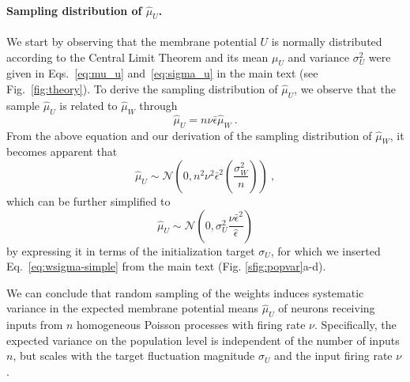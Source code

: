 \documentclass[11pt,a4paper]{article}
\begin{document}
\begin{refsection}
\paragraph{Sampling distribution of $\hat \mu_U$.}
We start by observing that the membrane potential $U$ is normally distributed according to the Central Limit Theorem and its mean $\mu_U$ and variance $\sigma_U^2$ were given in Eqs.~\eqref{eq:mu_u} and~\eqref{eq:sigma_u} in the main text (see Fig.~\ref{fig:theory}). 
To derive the sampling distribution of $\hat \mu_U$, we observe that the sample $\hat \mu_U$ is related to $\hat \mu_W$ through
\begin{equation}
    \hat \mu_U = n \nu \bar \epsilon \hat \mu_W  ~.
\end{equation}
From the above equation and our derivation of the sampling distribution of $\hat \mu_W$, it becomes apparent that
\begin{equation}
    \hat \mu_U \sim \mathcal{N} \left(0, n^2 \nu^2 \bar \epsilon^2 \left(\frac{\sigma_W^2}{n}\right) \right)  ~,
\end{equation}
which can be further simplified to 
\begin{equation}
    \hat \mu_U \sim \mathcal{N} \left(0, \sigma_U^2 \frac{\nu \bar \epsilon^2}{\hat\epsilon} \right)
\end{equation}
by expressing it in terms of the initialization target $\sigma_U$, for which we inserted Eq.~\eqref{eq:wsigma-simple} from the main text (Fig. \ref{sfig:popvar}a-d).

We can conclude that random sampling of the weights induces systematic variance in the expected membrane potential means $\hat \mu_U$ of neurons receiving inputs from $n$ homogeneous Poisson processes with firing rate $\nu$. Specifically, the expected variance on the population level is independent of the number of inputs $n$, but scales with the target fluctuation magnitude $\sigma_U$ and the input firing rate $\nu$.



\end{refsection}
\end{document}
